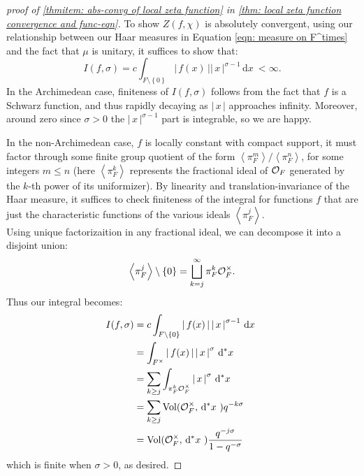\documentclass[11pt, x11names]{article}
\newcommand{\set}[1]{\left\{ #1 \right\}}
\newcommand{\brangle}[1]{\left\langle #1 \right\rangle}
\newcommand{\abs}[1]{\left| \, #1  \,\right|}
\newcommand{\dx}{\, \mathrm{d}x \ }
\renewcommand{\d}[1]{\, \mathrm{d}#1 \ }
\DeclareMathOperator{\vol}{Vol}
\begin{document}
\begin{proof}[proof of \ref{thmitem: abs-convg of local zeta function} in \ref{thm: local zeta function convergence and func-eqn}]
To show $Z(f, \chi)$ is absolutely convergent, using our relationship between our Haar measures in Equation \ref{eqn: measure on F^times} and the fact that $\mu$ is unitary, it suffices to show that:
\begin{equation*}
    I(f, \sigma) = c \int_{F \setminus \set{0}} \abs{f(x)} \abs{x}^{\sigma - 1} \dx < \infty.
\end{equation*}
In the Archimedean case, finiteness of $I(f, \sigma)$ follows from the fact that $f$ is a Schwarz function, and thus rapidly decaying as $\abs{x}$ approaches infinity. Moreover, around zero since $\sigma > 0$ the $\abs{x}^{\sigma - 1}$ part is integrable, so we are happy.

In the non-Archimedean case, $f$ is locally constant with compact support, it must factor through some finite group quotient of the form $\brangle{\pi_F^m}/\brangle{\pi_F^n}$, for some integers $m \leq n$ (here $\brangle{\pi_F^k}$ represents the fractional ideal of $\mathcal{O}_F$ generated by the $k$-th power of its uniformizer). By linearity and translation-invariance of the Haar measure, it suffices to check finiteness of the integral for functions $f$ that are just the characteristic functions of the various ideals $\brangle{\pi_F^j}$.\\
Using unique factorizaition in any fractional ideal, we can decompose it into a disjoint union:
\begin{equation*}
    \brangle{\pi_F^j} \setminus \set{0} = \bigsqcup^\infty_{k=j} \pi_F^k \calo_F^\times.
\end{equation*}
Thus our integral becomes:
\begin{align*}
        I(f, \sigma) &= c \int_{F \setminus \set{0}} \abs{f(x)} \abs{x}^{\sigma - 1} \dx \\
        &= \int_{F^\times} \abs{f(x)} \abs{x}^\sigma \d{^*x}\\
        &= \sum_{k \geq j} \int_{\pi^k_F \calo_F^\times} \abs{x}^\sigma \d{^*x}\\
        &= \sum_{k \geq j}\vol(\calo_F^\times, \d{^*x})q^{-k \sigma}\\
        &= \vol(\calo_F^\times, \d{^*x}) \frac{q^{-j\sigma}}{1 - q^{- \sigma}}
\end{align*}
which is finite when $\sigma > 0$, as desired.
\end{proof}
\end{document}
